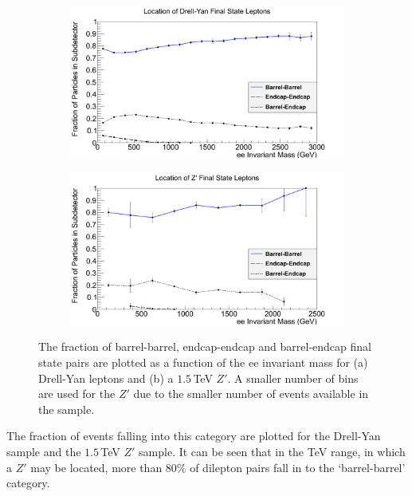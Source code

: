 \documentclass{article}
\begin{document}
\begin{figure}[htb]
    \begin{subfigure}{.5\textwidth}
        \raggedleft
        \includegraphics[width=\textwidth]{images/barrelEndcapDY.png}
        \caption{}
        \label{fig:BEDY}
    \end{subfigure}
    \begin{subfigure}{.5\textwidth}
       	\raggedright
        \includegraphics[width=\textwidth]{images/barrelEndcapZ.png}
        \caption{}
        \label{fig:BEZ}
    \end{subfigure}	
    \caption{The fraction of barrel-barrel, endcap-endcap and barrel-endcap final state pairs are plotted as a function of the ee invariant mass for (a) Drell-Yan leptons and (b) a $1.5\,$TeV $Z'$. A smaller number of bins are used for the $Z'$ due to the smaller number of events available in the sample.\label{fig:BarrelEndcap}}
\end{figure}

The fraction of events falling into this category are plotted for the Drell-Yan sample and the $1.5\,$TeV $Z'$ sample. It can be seen that in the TeV range, in which  a $Z'$ may be located, more than $80\%$ of dilepton pairs fall in to the `barrel-barrel' category. 
\end{document}
